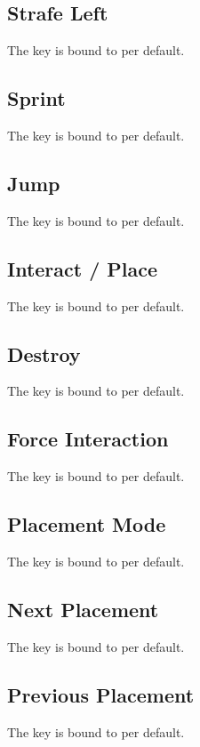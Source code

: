 \subsection{Strafe Left}\label{subsec:controls_strafe left}
The key is bound to
per default.

\subsection{Sprint}\label{subsec:controls_sprint}
The key is bound to
per default.

\subsection{Jump}\label{subsec:controls_jump}
The key is bound to
per default.

\subsection{Interact / Place}\label{subsec:controls_interact / place}
The key is bound to
per default.

\subsection{Destroy}\label{subsec:controls_destroy}
The key is bound to
per default.

\subsection{Force Interaction}\label{subsec:controls_force interaction}
The key is bound to
per default.

\subsection{Placement Mode}\label{subsec:controls_placement mode}
The key is bound to
per default.

\subsection{Next Placement}\label{subsec:controls_next placement}
The key is bound to
per default.

\subsection{Previous Placement}\label{subsec:controls_previous placement}
The key is bound to
per default.

